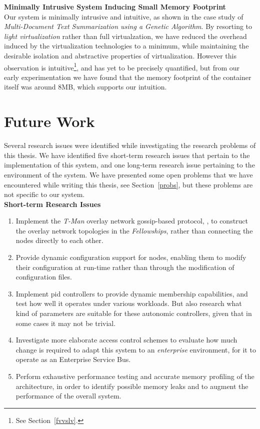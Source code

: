 \documentclass[12pt, titlepage]{uo_temp}
\begin{document}
     \textbf{Minimally Intrusive System Inducing Small Memory Footprint}\\
     Our system is minimally intrusive and intuitive, as shown in the case study of
     \emph{Multi-Document Text Summarization using a Genetic Algorithm}. By resorting to
     \emph{light virtualization} rather than full virtualzation, we have reduced the
     overhead induced by the virtualization technologies to a minimum, while maintaining
     the desirable isolation and abstractive properties of virtualization. However this
     observation is intuitive\footnote{See Section~\ref{fvvslv}.}, and has yet to be
     precisely quantified, but from our early experimentation we have found that the
     memory footprint of the container itself was around $8$MB, which supports our
     intuition.

     \section{Future Work}
     Several research issues were identified while investigating the research problems of
     this thesis. We have identified five short-term research issues that pertain to the
     implementation of this system, and one long-term research issue pertaining to the
     environment of the system. We have presented some open problems that we have
     encountered while writing this thesis, see Section~\ref{probs}, but these problems are
     not specific to our system.\\

     \textbf{Short-term Research Issues}
     \begin{enumerate}
     \item Implement the \emph{T-Man} overlay network gossip-based protocol,
       \cite{jelasity2009t}, to construct the overlay network topologies in the
       \emph{Fellowships}, rather than connecting the nodes directly to each other.
     \item Provide dynamic configuration support for nodes, enabling them to modify their
       configuration at run-time rather than through the modification of configuration
       files.
     \item Implement \gls{pid} controllers to provide dynamic membership capabilities, and
       test how well it operates under various workloads. But also research what kind of
       parameters are suitable for these autonomic controllers, given that in some cases
       it may not be trivial.
     \item Investigate more elaborate access control schemes to evaluate how much change
       is required to adapt this system to an \emph{enterprise} environment, for it to
       operate as an Enterprise Service Bus.
     \item Perform exhaustive performance testing and accurate memory profiling of the
       architecture, in order to identify possible memory leaks and to augment the
       performance of the overall system.
     \end{enumerate}
\end{document}
